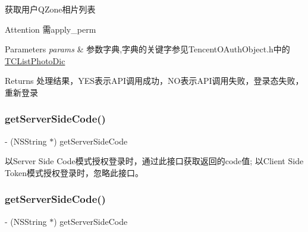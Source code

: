 获取用户\+Q\+Zone相片列表 \begin{DoxyAttention}{Attention}
需apply\+\_\+perm 
\end{DoxyAttention}

\begin{DoxyParams}{Parameters}
{\em params} & 参数字典,字典的关键字参见\+Tencent\+O\+Auth\+Object.\+h中的\mbox{\hyperlink{interface_t_c_list_photo_dic}{T\+C\+List\+Photo\+Dic}} \\
\hline
\end{DoxyParams}
\begin{DoxyReturn}{Returns}
处理结果，\+Y\+E\+S表示\+A\+P\+I调用成功，\+N\+O表示\+A\+P\+I调用失败，登录态失败，重新登录 
\end{DoxyReturn}
\mbox{\label{interface_tencent_o_auth_a6cf5e8f4d122592e70fb82076a0cd8d3}} 
\subsubsection{\texorpdfstring{get\+Server\+Side\+Code()}{getServerSideCode()}\hspace{0.1cm}{\footnotesize\ttfamily [1/2]}}
{\footnotesize\ttfamily -\/ (N\+S\+String $\ast$) get\+Server\+Side\+Code \begin{DoxyParamCaption}{ }\end{DoxyParamCaption}}

以\+Server Side Code模式授权登录时，通过此接口获取返回的code值; 以\+Client Side Token模式授权登录时，忽略此接口。 \mbox{\label{interface_tencent_o_auth_a6cf5e8f4d122592e70fb82076a0cd8d3}} 
\subsubsection{\texorpdfstring{get\+Server\+Side\+Code()}{getServerSideCode()}\hspace{0.1cm}{\footnotesize\ttfamily [2/2]}}
{\footnotesize\ttfamily -\/ (N\+S\+String $\ast$) get\+Server\+Side\+Code \begin{DoxyParamCaption}{ }\end{DoxyParamCaption}}

